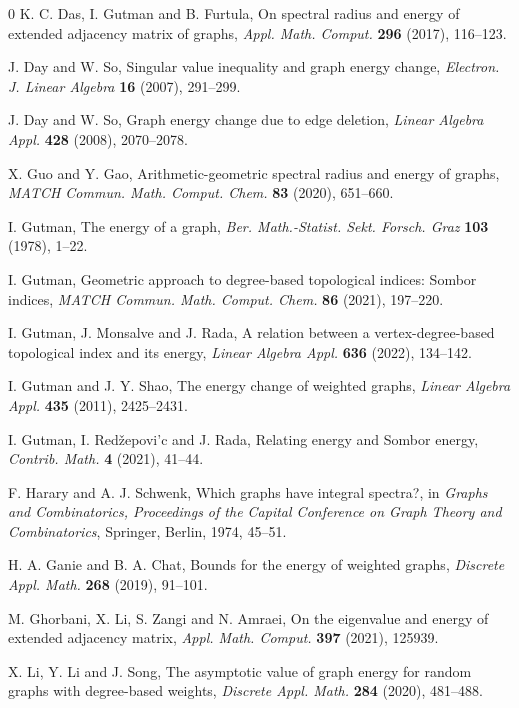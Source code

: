\documentclass[12pt,twoside]{article}
\begin{document}
\begin{thebibliography}{0}
	K. C. Das, I. Gutman and B. Furtula,
	On spectral radius and energy of extended adjacency matrix of graphs,
	\emph{Appl. Math. Comput.} \textbf{296} (2017), 116--123.
	
	J. Day and W. So,
	Singular value inequality and graph energy change,
	\emph{Electron. J. Linear Algebra} \textbf{16} (2007), 291--299.
	
	J. Day and W. So,
	Graph energy change due to edge deletion,
	\emph{Linear Algebra Appl.} \textbf{428} (2008), 2070--2078.
	
	X. Guo and Y. Gao,
	Arithmetic-geometric spectral radius and energy of graphs,
	\emph{MATCH Commun. Math. Comput. Chem.} \textbf{83} (2020), 651--660.
	
	I. Gutman,
	The energy of a graph,
	\emph{Ber. Math.-Statist. Sekt. Forsch. Graz} \textbf{103} (1978), 1--22.
	
	I. Gutman,
	Geometric approach to degree-based topological indices: Sombor indices,
	\emph{MATCH Commun. Math. Comput. Chem.} \textbf{86} (2021), 197--220.
	
	I. Gutman, J. Monsalve and J. Rada,
	A relation between a vertex-degree-based topological index and its energy,
	\emph{Linear Algebra Appl.} \textbf{636} (2022), 134--142.
	
	I. Gutman and J. Y. Shao,
	The energy change of weighted graphs,
	\emph{Linear Algebra Appl.} \textbf{435} (2011), 2425--2431.
	
	I. Gutman, I. Red\v{z}epovi'c and J. Rada,
	Relating energy and Sombor energy,
	\emph{Contrib. Math.} \textbf{4} (2021), 41--44.
	
	F. Harary and A. J. Schwenk,
	Which graphs have integral spectra?,
	in \emph{Graphs and Combinatorics, Proceedings of the Capital Conference on Graph Theory and Combinatorics},
	Springer, Berlin, 1974, 45--51.
	
	H. A. Ganie and B. A. Chat,
	Bounds for the energy of weighted graphs,
	\emph{Discrete Appl. Math.} \textbf{268} (2019), 91--101.
	
	M. Ghorbani, X. Li, S. Zangi and N. Amraei,
	On the eigenvalue and energy of extended adjacency matrix,
	\emph{Appl. Math. Comput.} \textbf{397} (2021), 125939.
	
	X. Li, Y. Li and J. Song,
	The asymptotic value of graph energy for random graphs with degree-based weights,
	\emph{Discrete Appl. Math.} \textbf{284} (2020), 481--488.
	

\end{thebibliography}
\end{document}
